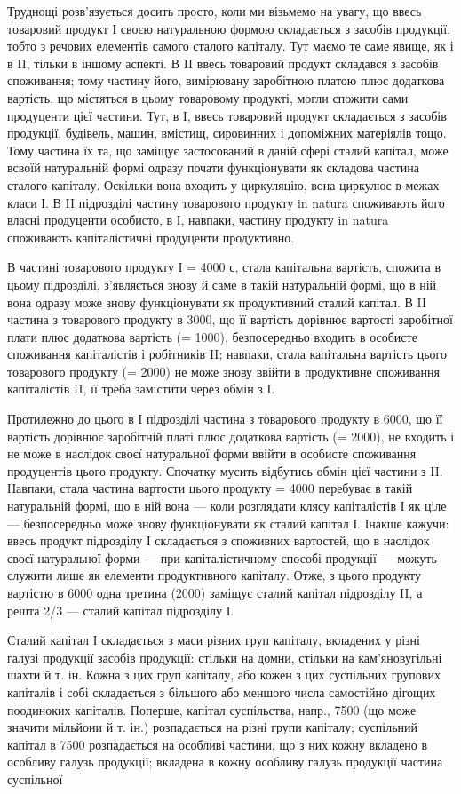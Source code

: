 Труднощі розв’язується досить просто, коли ми візьмемо на увагу,
що ввесь товаровий продукт І своєю натуральною формою складається
з засобів продукції, тобто з речових елементів самого сталого капіталу.
Тут маємо те саме явище, як і в II, тільки в іншому аспекті. В II ввесь товаровий
продукт складався з засобів споживання; тому частину його, вимірювану
заробітною платою плюс додаткова вартість, що містяться в цьому товаровому
продукті, могли спожити сами продуценти цієї частини. Тут, в
І, ввесь товаровий продукт складається з засобів продукції, будівель, машин,
вмістищ, сировинних і допоміжних матеріялів тощо. Тому частина їх
та, що заміщує застосований в даній сфері сталий капітал, може всвоїй натуральній
формі одразу почати функціонувати як складова частина сталого
капіталу. Оскільки вона входить у циркуляцію, вона циркулює в межах
класи І. В II підрозділі частину товарового продукту in natura споживають
його власні продуценти особисто, в І, навпаки, частину продукту
in natura споживають капіталістичні продуценти продуктивно.

В частині товарового продукту І = 4000 с, стала капітальна вартість,
спожита в цьому підрозділі, з’являється знову й саме в такій натуральній
формі, що в ній вона одразу може знову функціонувати як продуктивний
сталий капітал. В II частина з товарового продукту в 3000, що її вартість
дорівнює вартості заробітної плати плюс додаткова вартість (= 1000),
безпосередньо входить в особисте споживання капіталістів і робітників II;
навпаки, стала капітальна вартість цього товарового продукту (= 2000)
не може знову ввійти в продуктивне споживання капіталістів II, її треба
замістити через обмін з І.

Протилежно до цього в І підрозділі частина з товарового продукту
в 6000, що її вартість дорівнює заробітній платі плюс додаткова вартість
(= 2000), не входить і не може в наслідок своєї натуральної форми
ввійти в особисте споживання продуцентів цього продукту. Спочатку
мусить відбутись обмін цієї частини з II. Навпаки, стала частина вартости
цього продукту = 4000 перебуває в такій натуральній формі, що в ній
вона — коли розглядати клясу капіталістів І як ціле — безпосередньо може
знову функціонувати як сталий капітал І. Інакше кажучи: ввесь продукт
підрозділу І складається з споживних вартостей, що в наслідок своєї натуральної
форми — при капіталістичному способі продукції — можуть служити
лише як елементи продуктивного капіталу. Отже, з цього продукту
вартістю в 6000 одна третина (2000) заміщує сталий капітал підрозділу II,
а решта 2/3 — сталий капітал підрозділу І.

Сталий капітал І складається з маси різних груп капіталу, вкладених
у різні галузі продукції засобів продукції: стільки на домни, стільки на
кам’яновугільні шахти й т. ін. Кожна з цих груп капіталу, або кожен
з цих суспільних групових капіталів і собі складається з більшого або
меншого числа самостійно дігощих поодиноких капіталів. Поперше, капітал
суспільства, напр., 7500 (що може значити мільйони й т. ін.) розпадається
на різні групи капіталу; суспільний капітал в 7500 розпадається
на особливі частини, що з них кожну вкладено в особливу галузь продукції;
вкладена в кожну особливу галузь продукції частина суспільної
